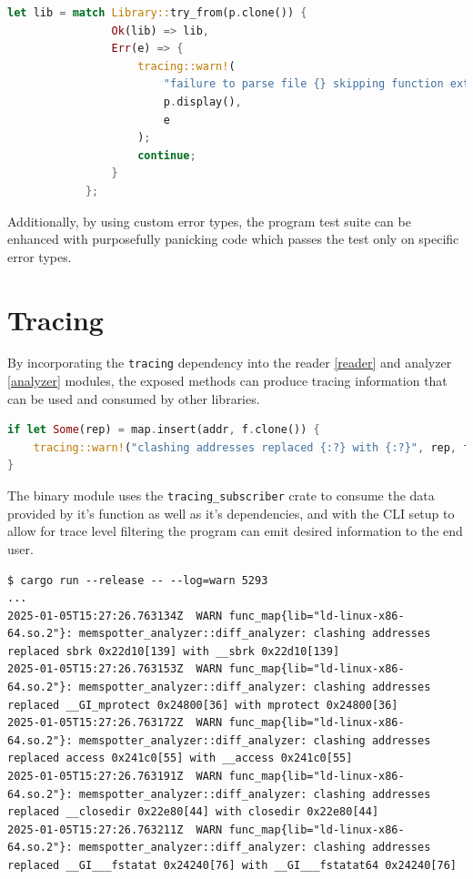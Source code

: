 \begin{lstlisting}[caption=\label{lst:err_handling}"Customm error handling example", language=Rust]
let lib = match Library::try_from(p.clone()) {
                Ok(lib) => lib,
                Err(e) => {
                    tracing::warn!(
                        "failure to parse file {} skipping function extraction ({})",
                        p.display(),
                        e
                    );
                    continue;
                }
            };
\end{lstlisting}

Additionally, by using custom error types, the program test suite can be enhanced with purposefully panicking code which passes the test only on specific error types.

\section{Tracing}

By incorporating the \verb|tracing| \cite{tokio-rs_team_tokio-rstracing_2024} dependency into the reader \autoref{reader} and analyzer \autoref{analyzer} modules, the exposed methods can produce tracing information that can be used and consumed by other libraries.

\begin{lstlisting}[language=Rust, caption="Code fragment showcasing conditionally emiting a warning"]
if let Some(rep) = map.insert(addr, f.clone()) {
    tracing::warn!("clashing addresses replaced {:?} with {:?}", rep, f);
}
\end{lstlisting}

The binary module uses the \verb|tracing_subscriber| \cite{tokio-rs_team_tokiotracingtracing-subscriber_2024} crate to consume the data provided by it's function as well as it's dependencies, and with the CLI setup to allow for trace level filtering the program can emit desired information to the end user.

\begin{lstlisting}[breaklines=true, caption="Fraction of the warnings emitted by the program with the log setting at warning level"]
$ cargo run --release -- --log=warn 5293
...
2025-01-05T15:27:26.763134Z  WARN func_map{lib="ld-linux-x86-64.so.2"}: memspotter_analyzer::diff_analyzer: clashing addresses replaced sbrk 0x22d10[139] with __sbrk 0x22d10[139]
2025-01-05T15:27:26.763153Z  WARN func_map{lib="ld-linux-x86-64.so.2"}: memspotter_analyzer::diff_analyzer: clashing addresses replaced __GI_mprotect 0x24800[36] with mprotect 0x24800[36]
2025-01-05T15:27:26.763172Z  WARN func_map{lib="ld-linux-x86-64.so.2"}: memspotter_analyzer::diff_analyzer: clashing addresses replaced access 0x241c0[55] with __access 0x241c0[55]
2025-01-05T15:27:26.763191Z  WARN func_map{lib="ld-linux-x86-64.so.2"}: memspotter_analyzer::diff_analyzer: clashing addresses replaced __closedir 0x22e80[44] with closedir 0x22e80[44]
2025-01-05T15:27:26.763211Z  WARN func_map{lib="ld-linux-x86-64.so.2"}: memspotter_analyzer::diff_analyzer: clashing addresses replaced __GI___fstatat 0x24240[76] with __GI___fstatat64 0x24240[76]
\end{lstlisting}